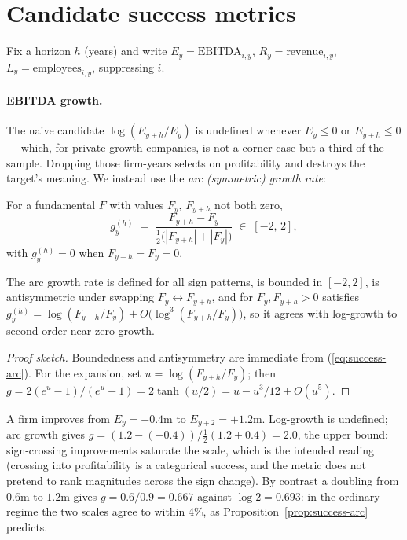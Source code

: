 \section{Candidate success metrics}
\label{sec:success-metrics}

Fix a horizon $h$ (years) and write $E_y = \text{EBITDA}_{i,y}$,
$R_y = \text{revenue}_{i,y}$, $L_y = \text{employees}_{i,y}$, suppressing $i$.

\paragraph{EBITDA growth.} The naive candidate $\log(E_{y+h}/E_y)$ is undefined whenever
$E_y \le 0$ or $E_{y+h} \le 0$ --- which, for private growth companies, is not a corner
case but a third of the sample. Dropping those firm-years selects on profitability and
destroys the target's meaning. We instead use the \emph{arc (symmetric) growth rate}:

\begin{definition}
\label{def:success-arc}
For a fundamental $F$ with values $F_y$, $F_{y+h}$ not both zero,
\begin{equation}
\label{eq:success-arc}
g^{(h)}_y \;=\; \frac{F_{y+h} - F_y}{\tfrac{1}{2}\big(|F_{y+h}| + |F_y|\big)}
\;\in\; [-2,\, 2],
\end{equation}
with $g^{(h)}_y = 0$ when $F_{y+h} = F_y = 0$.
\end{definition}

\begin{proposition}
\label{prop:success-arc}
The arc growth rate is defined for all sign patterns, is bounded in $[-2,2]$, is
antisymmetric under swapping $F_y \leftrightarrow F_{y+h}$, and for
$F_y, F_{y+h} > 0$ satisfies
$g^{(h)}_y = \log(F_{y+h}/F_y) + O\big(\log^3(F_{y+h}/F_y)\big)$,
so it agrees with log-growth to second order near zero growth.
\end{proposition}

\begin{proof}[Proof sketch]
Boundedness and antisymmetry are immediate from (\ref{eq:success-arc}). For the
expansion, set $u = \log(F_{y+h}/F_y)$; then
$g = 2(e^{u}-1)/(e^{u}+1) = 2\tanh(u/2) = u - u^3/12 + O(u^5)$.
\end{proof}

\begin{example}
\label{ex:success-arc}
A firm improves from $E_y = -0.4$m to $E_{y+2} = +1.2$m. Log-growth is undefined; arc
growth gives $g = (1.2 - (-0.4)) / \tfrac{1}{2}(1.2 + 0.4) = 2.0$, the upper bound:
sign-crossing improvements saturate the scale, which is the intended reading (crossing
into profitability is a categorical success, and the metric does not pretend to rank
magnitudes across the sign change). By contrast a doubling from $0.6$m to $1.2$m gives
$g = 0.6/0.9 = 0.667$ against $\log 2 = 0.693$: in the ordinary regime the two scales
agree to within 4\%, as Proposition~\ref{prop:success-arc} predicts.
\end{example}

